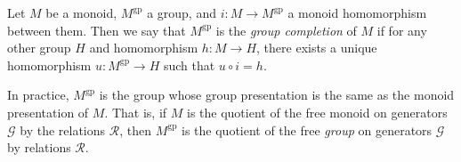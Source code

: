 \begin{defn} Let $M$ be a monoid, $M^{\mathrm{gp}}$ a group, and $i: M \to M^{\mathrm{gp}}$ a monoid homomorphism between them. Then we say that $M^{\mathrm{gp}}$ is the \emph{group completion} of $M$ if for any other group $H$ and homomorphism $h: M \to H$, there exists a unique homomorphism $u: M^{\mathrm{gp}} \to H$ such that $u \circ i = h$.
\end{defn}

In practice, $M^{\mathrm{gp}}$ is the group whose group presentation is the same as the monoid presentation of $M$. That is, if $M$ is the quotient of the free monoid on generators $\mathcal{G}$ by the relations $\mathcal{R}$, then $M^{\mathrm{gp}}$ is the quotient of the free \emph{group} on generators $\mathcal{G}$ by relations $\mathcal{R}$.

